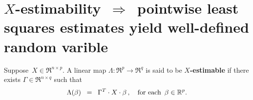 

\section{$X$-estimability \,$\Longrightarrow$\, pointwise least squares estimates yield well-defined random varible}
\setcounter{theorem}{0}
\setcounter{equation}{0}

\renewcommand{\theenumi}{\roman{enumi}}
\renewcommand{\labelenumi}{\textnormal{(\theenumi)}$\;\;$}


\begin{definition}[$X$-estimability]
\mbox{}\vskip 0.1cm\noindent
Suppose \,$X \in \Re^{n \times p}$.
A linear map $\Lambda : \Re^{p} \longrightarrow \Re^{q}$ is said to be \textbf{$X$-estimable}
if there exists $\Gamma \in \Re^{n \times q}$ such that
\begin{equation*}
\Lambda(\beta) \;\; =\;\; \Gamma^{T} \cdot X \cdot \beta\,,
\quad
\textnormal{for each \,$\beta \in \Re^{p}$}.
\end{equation*}
\end{definition}

